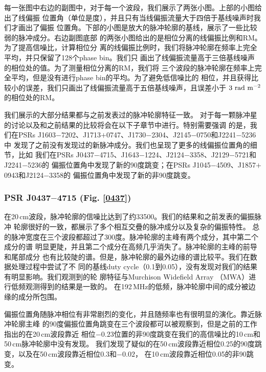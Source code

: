 每一张图中右边的副图中，对于每一个波段，我们展示了两张小图。上部的小图给出了线偏振
位置角（单位是度），并且只有当线偏振流量大于四倍于基线噪声时我们才画出了偏振
位置角。下部的小图是放大的脉冲轮廓的基线，展示了一些比较弱的脉冲成分。右边副图底部
的两张小图给出的是相位分离的线偏振比例和RM。为了提高信噪比，计算相位分
离的线偏振比例时，我们将脉冲轮廓在频率上完全平均，并只保留了128个phase bin。我们只
画出了线偏振流量高于三倍基线噪声的相位处的值。为了测量相位分离的RM，我们将
三个波段的脉冲轮廓在频率上完全平均，但是没有进行phase bin的平均。为了避免低信噪比的
相位，并且获得比较小的误差，我们只画出了线偏振流量高于五倍基线噪声，且误差小于
$3\ \rm{rad\ m^{-2}}$的相位处的RM。

我们展示的大部分结果都与之前发表过的脉冲轮廓特征一致\supercite{Ord04,Yan11a}。
对于每一颗脉冲星的讨论以及和之前结果的比较将会在以下子章节中进行。特别需要强调
的是，我们在PSRs J1603$-$7202、J1713$+$0747、J1730$-$2304、J2145$-$0750和J2241$-$5236中
发现了之前没有发现过的新脉冲成分。我们也呈现了更多的线偏振位置角的细节，比如
我们在PSRs J0437$-$4715、J1643$-$1224、J2124$-$3358、J2129$-$5721和J2241$-$5236的
偏振位置角中发现了新的90度跳变；在PSRs J1045$-$4509、J1857$+$0943和J2124$-$3358的
偏振位置角中发现了新的非90度跳变。

\subsubsection{PSR J0437$-$4715 (Fig. \ref{0437})}

在20\,cm波段，脉冲轮廓的信噪比达到了约33500。我们的结果和之前发表的偏振脉冲
轮廓很好的一致，都展示了多个相互交疊的脉冲成分以及复杂的偏振特性\supercite{Johnston93,Manchester95a,Navarro97,Yan11a}。
总的脉冲宽度在三个波段都超过了300度。脉冲轮廓的主峰有两个成分，其中第二个成分的谱
明显更陡，并且第二个成分在高频几乎消失了。脉冲轮廓的主峰的前导和尾部成分
也有比较陡的谱。但是，脉冲轮廓的最外边缘的谱比较平。我们在数据处理过程中尝试了不
同的基线duty cycle（0.1到0.05），没有发现对我们的结果有明显影响。我们观测到的轮
廓特征与Murchison Widefield Array （MWA）进行低频观测得到的结果是一致的\supercite{Bhat14}。
在192\,MHz的低频，脉冲轮廓中间的成分被边缘的成分所包围。

偏振位置角随脉冲相位有非常剧烈的变化，并且随频率也有很明显的演化。靠近脉冲轮廓主峰
的90度偏振位置角跳变在三个波段都可以被观察到，但是之前的工作指出的在20\,cm波段靠近
相位$-0.23$位置的非90度跳变在我们的高信噪比的10\,cm和50\,cm脉冲轮廓中没有发现。
我们发现了疑似的在50\,cm波段靠近相位0.25的90度跳变，以及在50\,cm波段靠近相位0.3和$-0.02$，
在10\,cm波段靠近相位0.05的非90跳变。

